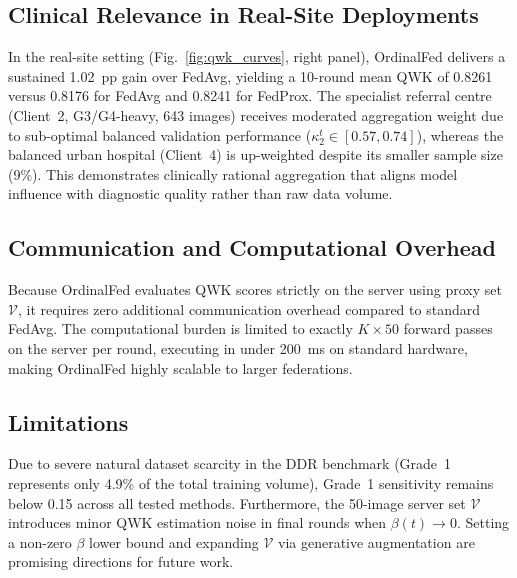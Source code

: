 \subsection{Clinical Relevance in Real-Site Deployments}

In the real-site setting (Fig.~\ref{fig:qwk_curves}, right panel), OrdinalFed
delivers a sustained 1.02~pp gain over FedAvg, yielding a 10-round mean QWK of
0.8261 versus 0.8176 for FedAvg and 0.8241 for FedProx. The specialist referral
centre (Client~2, G3/G4-heavy, 643 images) receives moderated aggregation weight
due to sub-optimal balanced validation performance ($\kappa_2^t \in [0.57, 0.74]$),
whereas the balanced urban hospital (Client~4) is up-weighted despite its smaller
sample size (9\%). This demonstrates clinically rational aggregation that aligns
model influence with diagnostic quality rather than raw data volume.

\subsection{Communication and Computational Overhead}

Because OrdinalFed evaluates QWK scores strictly on the server using proxy set
$\mathcal{V}$, it requires zero additional communication overhead compared to
standard FedAvg. The computational burden is limited to exactly $K \times 50$
forward passes on the server per round, executing in under 200~ms on standard
hardware, making OrdinalFed highly scalable to larger federations.

\subsection{Limitations}

Due to severe natural dataset scarcity in the DDR benchmark (Grade~1 represents
only 4.9\% of the total training volume), Grade~1 sensitivity remains below 0.15
across all tested methods. Furthermore, the 50-image server set $\mathcal{V}$
introduces minor QWK estimation noise in final rounds when $\beta(t) \to 0$.
Setting a non-zero $\beta$ lower bound and expanding $\mathcal{V}$ via generative
augmentation are promising directions for future work.
